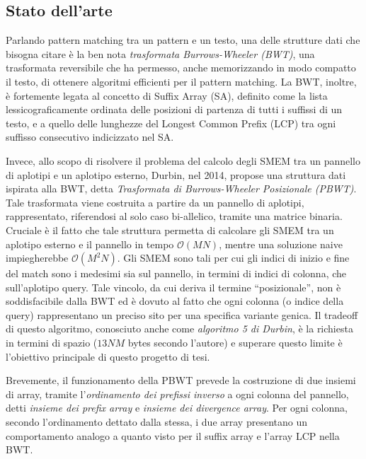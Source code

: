 \documentclass[a4paper,11pt, oneside,italian]{article}
\begin{document}
\subsection*{Stato dell'arte}
Parlando pattern matching tra un pattern e un testo, una delle strutture dati
che bisogna citare è la ben nota \textit{trasformata 
  Burrows-Wheeler (BWT)}, una trasformata reversibile che ha permesso, anche
memorizzando in modo compatto il testo, di ottenere algoritmi efficienti per il
pattern matching. 
La BWT, inoltre, è fortemente legata al concetto di Suffix Array (SA), definito
come la lista lessicograficamente ordinata delle posizioni di partenza di 
tutti i suffissi di un testo, e a quello delle lunghezze del Longest Common
Prefix (LCP) tra ogni suffisso consecutivo indicizzato nel SA.

Invece, allo scopo di risolvere il problema del calcolo degli SMEM tra un
pannello di aplotipi e un aplotipo esterno,
Durbin, nel 2014, propose una struttura dati ispirata alla BWT, detta
\textit{Trasformata di Burrows-Wheeler Posizionale (PBWT)}. Tale trasformata
viene costruita a partire da un pannello di aplotipi, rappresentato, riferendosi
al solo caso bi-allelico, tramite una matrice binaria.
Cruciale è il fatto che tale struttura permetta di calcolare gli SMEM tra
un aplotipo esterno e il pannello in tempo $\mathcal{O}(MN)$, mentre 
una soluzione naive impiegherebbe $\mathcal{O}(M^2N)$. Gli SMEM sono tali per
cui gli indici di inizio 
e fine del match sono i medesimi sia sul pannello, in termini di indici di
colonna, che sull'aplotipo query. Tale 
vincolo, da cui deriva il termine
``posizionale'', non è soddisfacibile dalla BWT ed è dovuto al fatto che ogni 
colonna (o indice della query) rappresentano un preciso sito per una specifica
variante genica. Il tradeoff di questo algoritmo, conosciuto anche come
\textit{algoritmo 5 di Durbin}, è la richiesta in termini di spazio ($13NM$
bytes secondo l'autore) e superare questo limite è l'obiettivo principale di
questo progetto di tesi.

Brevemente, il funzionamento della PBWT prevede la costruzione di due insiemi di
array, tramite 
l'\textit{ordinamento dei prefissi inverso} a ogni colonna del pannello, detti
\textit{insieme dei prefix array} e \textit{insieme dei divergence array}. Per
ogni colonna, secondo l'ordinamento dettato dalla stessa, i due array presentano
un comportamento analogo a quanto visto per il suffix array e l'array LCP nella
BWT.
\end{document}
